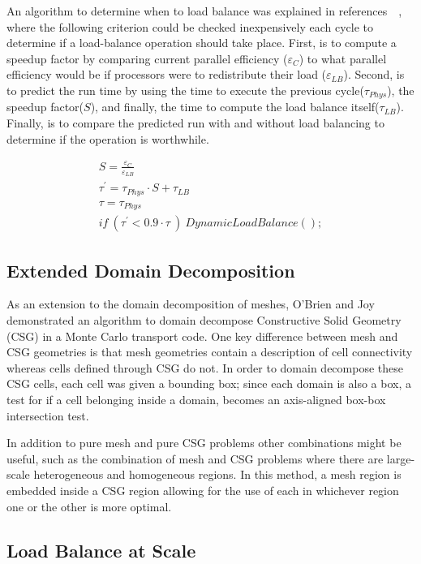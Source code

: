 An algorithm to determine when to load balance was explained in references~\cite{procassini2005load}~\cite{o2005dynamic}, where the following criterion could be checked inexpensively each cycle to determine if a load-balance operation should take place.
%
First, is to compute a speedup factor by comparing current parallel efficiency ($ \varepsilon_C $) to what parallel efficiency would be if processors were to redistribute their load ($ \varepsilon_{LB} $).
%
Second, is to predict the run time by using the time to execute the previous cycle($ \tau_{Phys} $), the speedup factor($S$), and finally, the time to compute the load balance itself($ \tau_{LB} $).
%
Finally, is to compare the predicted run with and without load balancing to determine if the operation is worthwhile.~\cite{o2005dynamic}


\begin{eqnarray}
S = \frac{\varepsilon_C}{\varepsilon_{LB}} \\
\tau^{'} = \tau_{Phys} \cdot S + \tau_{LB} \\
\tau = \tau_{Phys} \\
if\ (\tau^{'} < 0.9 \cdot \tau \ )\ DynamicLoadBalance();
\end{eqnarray}

\subsection*{Extended Domain Decomposition}

As an extension to the domain decomposition of meshes, O'Brien and Joy demonstrated an algorithm to domain decompose Constructive Solid Geometry (CSG) in a Monte Carlo transport code.
%
One key difference between mesh and CSG geometries is that mesh geometries contain a description of cell connectivity whereas cells defined through CSG do not.
%
In order to domain decompose these CSG cells, each cell was given a bounding box; since each domain is also a box, a test for if a cell belonging inside a domain, becomes an axis-aligned box-box intersection test.~\cite{o2009domain}
%

In addition to pure mesh and pure CSG problems other combinations might be useful, such as the combination of mesh and CSG problems where there are large-scale heterogeneous and homogeneous regions.
%
In this method, a mesh region is embedded inside a CSG region allowing for the use of each in whichever region one or the other is more optimal.
~\cite{greenman2009enhancements}

\subsection*{Load Balance at Scale}

